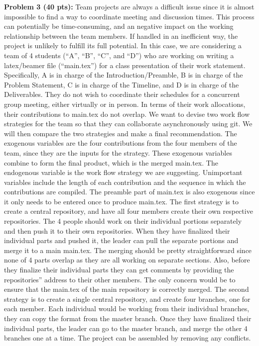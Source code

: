 \documentclass[12pt]{article}
\begin{document}
\newpage
\noindent\textbf{Problem 3 (40 pts):}
\vskip0.25in Team projects are always a difficult issue since it is almost impossible to find a way to coordinate meeting and discussion times. This process can potentially be time-consuming, and an negative impact on the working relationship between the team members. If handled in an inefficient way, the project is unlikely to fulfill its full potential. In this case, we are considering a team of 4 students (“A”, “B”, “C”, and “D”) who are working on writing a latex/beamer file (“main.tex”) for a class presentation of their work statement. Specifically, A is in charge of the Introduction/Preamble, B is in charge of the Problem Statement, C is in charge of the Timeline, and D is in charge of the Deliverables. They do not wish to coordinate their schedules for a concurrent group meeting, either virtually or in person. In terms of their work allocations, their contributions to main.tex do not overlap. We want to devise two work flow strategies for the team so that they can collaborate asynchronously using git. We will then compare the two strategies and make a final recommendation. 
\vskip0.25in The exogenous variables are the four contributions from the four  members of the team, since they are the inputs for the strategy. These exogenous variables combine to form the final product, which is the merged main.tex. The endogenous variable is the work flow strategy we are suggesting. Unimportant variables include the length of each contribution and the sequence in which the contributions are compiled. The preamble part of main.tex is also exogenous since it only needs to be entered once to produce main.tex.
\vskip0.25in The first strategy is to create a central repository, and have all four members create their own respective repositories. The 4 people should work on their individual portions separately and then push it to their own repositories. When they have finalized their individual parts and pushed it, the leader can pull the separate portions and merge it to a main main.tex. The merging should be pretty straightforward since none of 4 parts overlap as they are all working on separate sections. Also, before they finalize their individual parts they can get comments by providing the repositories'' address to their other members. The only concern would be to ensure that the main.tex of the main repository is correctly merged. 
\vskip0.25in The second strategy is to create a single central repository, and create four branches, one for each member. Each individual would be working from their individual branches, they can copy the format from the master branch. Once they have finalized their individual parts, the leader can go to the master branch, and merge the other 4 branches one at a time. The project can be assembled by removing any conflicts. 
\end{document}
